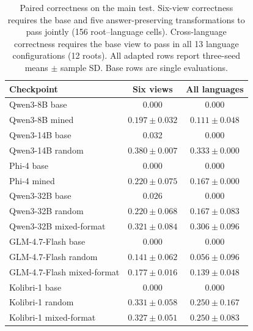 \begin{table}[tbp]
\caption{Paired correctness on the main test. Six-view correctness requires the base and five answer-preserving transformations to pass jointly (156 root--language cells). Cross-language correctness requires the base view to pass in all 13 language configurations (12 roots). All adapted rows report three-seed means $\pm$ sample SD. Base rows are single evaluations.}\label{t:paired}
\centering\footnotesize\setlength{\tabcolsep}{3pt}
\begin{tabular}{lcc}\toprule
Checkpoint & Six views & All languages\\\midrule
Qwen3-8B base & 0.000 & 0.000\\
Qwen3-8B mined & $0.197\pm0.032$ & $0.111\pm0.048$\\
Qwen3-14B base & 0.032 & 0.000\\
Qwen3-14B random & $0.380\pm0.007$ & $0.333\pm0.000$\\
Phi-4 base & 0.000 & 0.000\\
Phi-4 mined & $0.220\pm0.075$ & $0.167\pm0.000$\\
Qwen3-32B base & $0.026$ & $0.000$\\
Qwen3-32B random & $0.220\pm0.068$ & $0.167\pm0.083$\\
Qwen3-32B mixed-format & $0.321\pm0.084$ & $0.306\pm0.096$\\
GLM-4.7-Flash base & $0.000$ & $0.000$\\
GLM-4.7-Flash random & $0.141\pm0.062$ & $0.056\pm0.096$\\
GLM-4.7-Flash mixed-format & $0.177\pm0.016$ & $0.139\pm0.048$\\
Kolibri-1 base & $0.000$ & $0.000$\\
Kolibri-1 random & $0.331\pm0.058$ & $0.250\pm0.167$\\
Kolibri-1 mixed-format & $0.327\pm0.051$ & $0.250\pm0.083$\\
\bottomrule\end{tabular}
\end{table}
